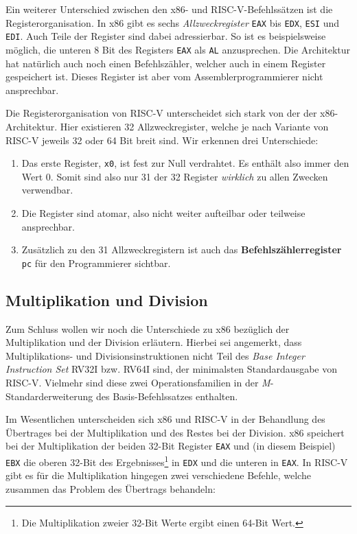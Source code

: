Ein weiterer Unterschied zwischen den x86- und RISC-V-Befehlssätzen ist die
Registerorganisation. In x86 gibt es sechs \emph{Allzweckregister}
\lstinline[style=x86Assembler]!EAX! bis \lstinline[style=x86Assembler]!EDX!, \lstinline[style=x86Assembler]!ESI! und \lstinline[style=x86Assembler]!EDI!. Auch Teile der Register sind dabei adressierbar.
So ist es beispielsweise
möglich, die unteren 8 Bit des Registers \lstinline[style=x86Assembler]!EAX! als \lstinline[style=x86Assembler]!AL!
anzusprechen. Die Architektur hat natürlich auch noch einen Befehlszähler,
welcher auch in einem Register gespeichert ist. Dieses Register ist aber vom
Assemblerprogrammierer nicht ansprechbar.

Die Registerorganisation von RISC-V unterscheidet sich stark von der der x86-Architektur. Hier existieren
32 Allzweckregister, welche je nach Variante von RISC-V jeweils 32 oder
64 Bit breit sind. Wir erkennen drei Unterschiede:

\begin{enumerate}
  \item Das erste Register, \lstinline[style=risc-v_Assembler]!x0!, ist fest zur Null verdrahtet. Es enthält
    also immer den Wert 0. Somit sind also nur 31 der 32 Register
    \emph{wirklich} zu allen Zwecken verwendbar.
  \item Die Register sind atomar, also nicht weiter aufteilbar oder teilweise
    ansprechbar.
  \item Zusätzlich zu den 31 Allzweckregistern ist auch das
    \textbf{Befehlszählerregister} \lstinline[style=risc-v_Assembler]!pc! für den Programmierer sichtbar.
\end{enumerate}

\subsection{Multiplikation und Division}

Zum Schluss wollen wir noch die Unterschiede zu x86 bezüglich der Multiplikation
und der Division erläutern. Hierbei sei angemerkt, dass Multiplikations- und
Divisionsinstruktionen nicht Teil des \emph{Base Integer Instruction Set} RV32I
bzw. RV64I sind, der minimalsten Standardausgabe von RISC-V. Vielmehr sind
diese zwei Operationsfamilien in der \emph{M}-Standarderweiterung des Basis-Befehlssatzes
enthalten.

Im Wesentlichen unterscheiden sich x86 und RISC-V in der Behandlung
des Übertrages bei der Multiplikation und des Restes bei der Division.
x86 speichert bei der Multiplikation der beiden 32-Bit Register \lstinline[style=x86Assembler]!EAX! und
(in diesem Beispiel) \lstinline[style=x86Assembler]!EBX! die oberen 32-Bit des Ergebnisses\footnote{Die
  Multiplikation zweier 32-Bit Werte ergibt einen 64-Bit Wert.} in \lstinline[style=x86Assembler]!EDX!
und die unteren in \lstinline[style=x86Assembler]!EAX!. In RISC-V gibt es für die Multiplikation hingegen
zwei verschiedene Befehle, welche zusammen das Problem des Übertrags behandeln:

